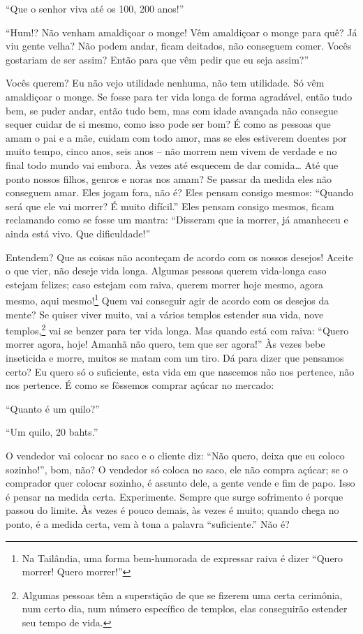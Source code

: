 “Que o senhor viva até os 100, 200 anos!” 

“Hum!? Não venham amaldiçoar o monge! Vêm amaldiçoar o monge para
quê? Já viu gente velha? Não podem andar, ficam deitados, não conseguem
comer. Vocês gostariam de ser assim? Então para que vêm pedir que eu
seja assim?”

Vocês querem? Eu não vejo utilidade nenhuma, não tem utilidade. Só
vêm amaldiçoar o monge. Se fosse para ter vida longa de forma
agradável, então tudo bem, se puder andar, então tudo bem, mas com
idade avançada não consegue sequer cuidar de si mesmo, como isso pode
ser bom? É como as pessoas que amam o pai e a mãe, cuidam com todo
amor, mas se eles estiverem doentes por muito tempo, cinco anos, seis
anos – não morrem nem vivem de verdade e no final todo mundo vai
embora. Às vezes até esquecem de dar comida… Até que ponto nossos
filhos, genros e noras nos amam? Se passar da medida eles não conseguem
amar. Eles jogam fora, não é? Eles pensam consigo mesmos: “Quando será
que ele vai morrer? É muito difícil.” Eles pensam consigo mesmos, ficam
reclamando como se fosse um mantra: “Disseram que ia morrer, já
amanheceu e ainda está vivo. Que dificuldade!”

Entendem? Que as coisas não aconteçam de acordo com os nossos
desejos! Aceite o que vier, não deseje vida longa. Algumas pessoas
querem vida-longa caso estejam felizes; caso estejam com raiva, querem
morrer hoje mesmo, agora mesmo, aqui mesmo!\footnote{Na Tailândia, uma
forma bem-humorada de expressar raiva é dizer “Quero morrer! Quero
morrer!”} Quem vai conseguir agir de acordo com os desejos da mente?
Se quiser viver muito, vai a vários templos estender sua vida, nove
templos,\footnote{Algumas pessoas têm a superstição de que se fizerem
uma certa cerimônia, num certo dia, num número específico de templos,
elas conseguirão estender seu tempo de vida.} vai se benzer para ter
vida longa. Mas quando está com raiva: “Quero morrer agora, hoje!
Amanhã não quero, tem que ser agora!” Às vezes bebe inseticida e morre,
muitos se matam com um tiro. Dá para dizer que pensamos certo? Eu quero
só o suficiente, esta vida em que nascemos não nos pertence, não nos
pertence. É como se fôssemos comprar açúcar no mercado:

“Quanto é um quilo?”

“Um quilo, 20 bahts.”

O vendedor vai colocar no saco e o cliente diz: “Não quero, deixa
que eu coloco sozinho!”, bom, não? O vendedor só coloca no saco, ele
não compra açúcar; se o comprador quer colocar sozinho, é assunto dele,
a gente vende e fim de papo. Isso é pensar na medida certa.
Experimente. Sempre que surge sofrimento é porque passou do limite. Às
vezes é pouco demais, às vezes é muito; quando chega no ponto, é a
medida certa, vem à tona a palavra “suficiente.” Não é?

